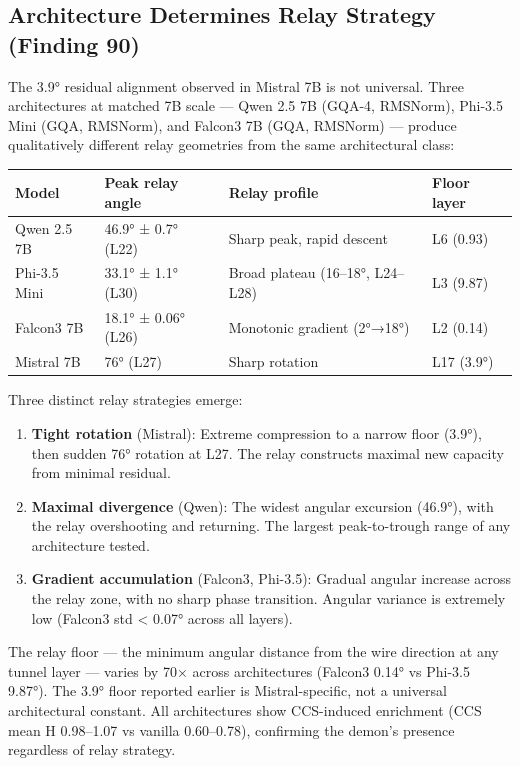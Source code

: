 \documentclass[12pt]{article}
\begin{document}
\subsection{Architecture Determines Relay Strategy (Finding 90)}

The 3.9° residual alignment observed in Mistral 7B is not universal. Three architectures at matched 7B scale — Qwen 2.5 7B (GQA-4, RMSNorm), Phi-3.5 Mini (GQA, RMSNorm), and Falcon3 7B (GQA, RMSNorm) — produce qualitatively different relay geometries from the same architectural class:

\begin{table}[h]
\centering
\small
\begin{tabular}{llll}
\toprule
\textbf{Model} & \textbf{Peak relay angle} & \textbf{Relay profile} & \textbf{Floor layer} \\
\midrule
Qwen 2.5 7B & 46.9° ± 0.7° (L22) & Sharp peak, rapid descent & L6 (0.93) \\
Phi-3.5 Mini & 33.1° ± 1.1° (L30) & Broad plateau (16–18°, L24–L28) & L3 (9.87) \\
Falcon3 7B & 18.1° ± 0.06° (L26) & Monotonic gradient (2°→18°) & L2 (0.14) \\
Mistral 7B & 76° (L27) & Sharp rotation & L17 (3.9°) \\
\bottomrule
\end{tabular}
\end{table}


Three distinct relay strategies emerge:

\begin{enumerate}
\item \textbf{Tight rotation} (Mistral): Extreme compression to a narrow floor (3.9°), then sudden 76° rotation at L27. The relay constructs maximal new capacity from minimal residual.
\item \textbf{Maximal divergence} (Qwen): The widest angular excursion (46.9°), with the relay overshooting and returning. The largest peak-to-trough range of any architecture tested.
\item \textbf{Gradient accumulation} (Falcon3, Phi-3.5): Gradual angular increase across the relay zone, with no sharp phase transition. Angular variance is extremely low (Falcon3 std < 0.07° across all layers).
\end{enumerate}

The relay floor — the minimum angular distance from the wire direction at any tunnel layer — varies by 70× across architectures (Falcon3 0.14° vs Phi-3.5 9.87°). The 3.9° floor reported earlier is Mistral-specific, not a universal architectural constant. All architectures show CCS-induced enrichment (CCS mean H 0.98–1.07 vs vanilla 0.60–0.78), confirming the demon's presence regardless of relay strategy.
\end{document}
